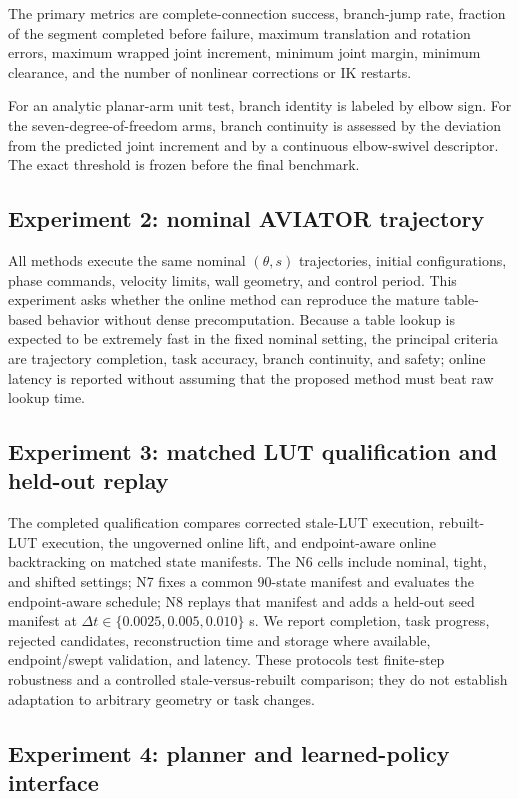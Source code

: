 \documentclass[preprint,12pt]{elsarticle}
\begin{document}
The primary metrics are complete-connection success, branch-jump rate, fraction of the segment completed before failure, maximum translation and rotation errors, maximum wrapped joint increment, minimum joint margin, minimum clearance, and the number of nonlinear corrections or IK restarts.

For an analytic planar-arm unit test, branch identity is labeled by elbow sign. For the seven-degree-of-freedom arms, branch continuity is assessed by the deviation from the predicted joint increment and by a continuous elbow-swivel descriptor. The exact threshold is frozen before the final benchmark.

\subsection{Experiment 2: nominal AVIATOR trajectory}

All methods execute the same nominal $(\theta,s)$ trajectories, initial configurations, phase commands, velocity limits, wall geometry, and control period. This experiment asks whether the online method can reproduce the mature table-based behavior without dense precomputation. Because a table lookup is expected to be extremely fast in the fixed nominal setting, the principal criteria are trajectory completion, task accuracy, branch continuity, and safety; online latency is reported without assuming that the proposed method must beat raw lookup time.

\subsection{Experiment 3: matched LUT qualification and held-out replay}

The completed qualification compares corrected stale-LUT execution, rebuilt-LUT execution, the ungoverned online lift, and endpoint-aware online backtracking on matched state manifests. The N6 cells include nominal, tight, and shifted settings; N7 fixes a common 90-state manifest and evaluates the endpoint-aware schedule; N8 replays that manifest and adds a held-out seed manifest at $\Delta t\in\{0.0025,0.005,0.010\}$ s. We report completion, task progress, rejected candidates, reconstruction time and storage where available, endpoint/swept validation, and latency. These protocols test finite-step robustness and a controlled stale-versus-rebuilt comparison; they do not establish adaptation to arbitrary geometry or task changes.

\subsection{Experiment 4: planner and learned-policy interface}
\end{document}
